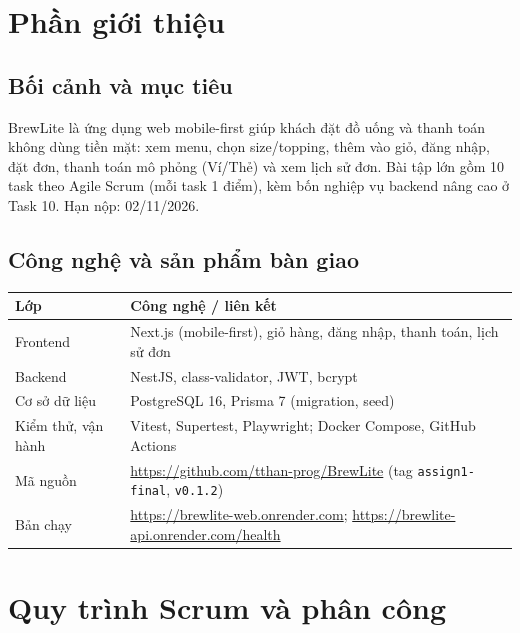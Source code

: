 \documentclass[a4paper]{article}
\begin{document}
\thispagestyle{empty}

\newpage
\tableofcontents
\newpage

\section{Phần giới thiệu}
\subsection{Bối cảnh và mục tiêu}
BrewLite là ứng dụng web mobile-first giúp khách đặt đồ uống và thanh toán không dùng tiền mặt: xem menu, chọn size/topping, thêm vào giỏ, đăng nhập, đặt đơn, thanh toán mô phỏng (Ví/Thẻ) và xem lịch sử đơn. Bài tập lớn gồm 10 task theo Agile Scrum (mỗi task 1 điểm), kèm bốn nghiệp vụ backend nâng cao ở Task 10. Hạn nộp: 02/11/2026.

\subsection{Công nghệ và sản phẩm bàn giao}
\begin{center}
\small\everymath{}
\begin{tabular}{@{}p{2.8cm}p{11.2cm}@{}}
\toprule
\textbf{Lớp} & \textbf{Công nghệ / liên kết} \\ \midrule
Frontend & Next.js (mobile-first), giỏ hàng, đăng nhập, thanh toán, lịch sử đơn \\
Backend & NestJS, class-validator, JWT, bcrypt \\
Cơ sở dữ liệu & PostgreSQL 16, Prisma 7 (migration, seed) \\
Kiểm thử, vận hành & Vitest, Supertest, Playwright; Docker Compose, GitHub Actions \\
Mã nguồn & \url{https://github.com/tthan-prog/BrewLite} (tag \texttt{assign1-final}, \texttt{v0.1.2}) \\
Bản chạy & \url{https://brewlite-web.onrender.com}; \url{https://brewlite-api.onrender.com/health} \\
\bottomrule
\end{tabular}
\end{center}

\section{Quy trình Scrum và phân công}
\end{document}
